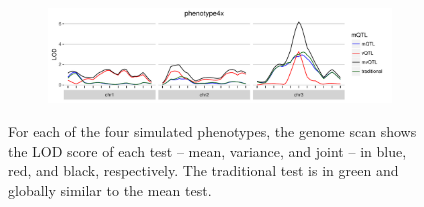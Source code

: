 \documentclass[9pt,twocolumn,twoside]{gsag3jnl}
\begin{document}
\begin{figure}[ht!]
    \begin{subfigure}[b]{0.5\textwidth}
        \includegraphics[width=\textwidth]{images/LOD_scan_phenotype4x.pdf}
    \end{subfigure}
    
    \caption{For each of the four simulated phenotypes, the genome scan shows the LOD score of each test -- mean, variance, and joint -- in blue, red, and black, respectively.  The traditional test is in green and globally similar to the mean test. \label{fig:apdx_lod_score_scans}}
\end{figure}
\end{document}
